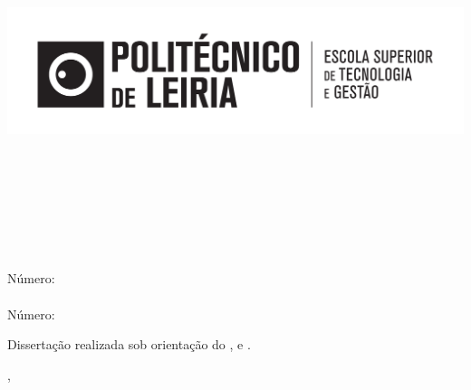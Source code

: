 
\begin{titlepage}

\begin{center}

\hfill

\includegraphics[width=\textwidth]{Covers/estg_h.pdf} \\

\bigskip
\large
\myFaculty \\
\mySchool \\ 
\myDepartment \\
\myDegree \\



\begingroup
\color{Maroon}

\vspace{4cm}

\spacedallcaps{\myTitle} \\ \bigskip %
\endgroup

\vspace{4cm}



\spacedlowsmallcaps{\myNameOne}\\
Número: \myNumberOne \\
\spacedlowsmallcaps{\myNameTwo}\\
Número: \myNumberTwo \\
\bigskip %

\vfill
\begin{normalsize}
    
    \noindent Dissertação realizada sob orientação do \myProfOne, \myProfTwo e \myProfThree.

\end{normalsize}
\bigskip
\myLocation, \myTime\ %
\end{center}


\vspace{1cm}

\begin{center}


    
\end{center}




\end{titlepage}

\cleardoublepage


